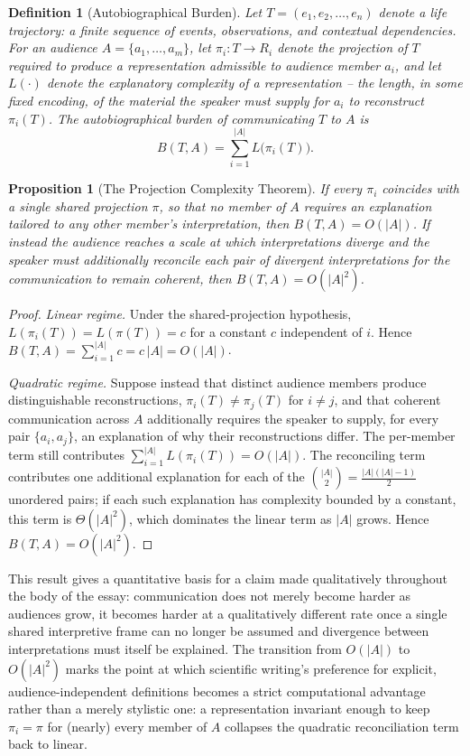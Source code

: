 \documentclass[11pt]{article}
\theoremstyle{plain}
\newtheorem{definition}{Definition}[section]
\newtheorem{proposition}{Proposition}[section]
\begin{document}
\begin{definition}[Autobiographical Burden]
Let $T = (e_1, e_2, \ldots, e_n)$ denote a life trajectory: a finite sequence of events, observations, and contextual dependencies. For an audience $A = \{a_1,\ldots,a_m\}$, let $\pi_i : T \to R_i$ denote the projection of $T$ required to produce a representation admissible to audience member $a_i$, and let $L(\cdot)$ denote the explanatory complexity of a representation -- the length, in some fixed encoding, of the material the speaker must supply for $a_i$ to reconstruct $\pi_i(T)$. The autobiographical burden of communicating $T$ to $A$ is
\[
B(T,A) = \sum_{i=1}^{|A|} L\big(\pi_i(T)\big).
\]
\end{definition}

\begin{proposition}[The Projection Complexity Theorem]
If every $\pi_i$ coincides with a single shared projection $\pi$, so that no member of $A$ requires an explanation tailored to any other member's interpretation, then $B(T,A) = O(|A|)$. If instead the audience reaches a scale at which interpretations diverge and the speaker must additionally reconcile each pair of divergent interpretations for the communication to remain coherent, then $B(T,A) = O(|A|^2)$.
\end{proposition}
\begin{proof}
\emph{Linear regime.} Under the shared-projection hypothesis, $L(\pi_i(T)) = L(\pi(T)) = c$ for a constant $c$ independent of $i$. Hence $B(T,A) = \sum_{i=1}^{|A|} c = c\,|A| = O(|A|)$.

\emph{Quadratic regime.} Suppose instead that distinct audience members produce distinguishable reconstructions, $\pi_i(T) \neq \pi_j(T)$ for $i \neq j$, and that coherent communication across $A$ additionally requires the speaker to supply, for every pair $\{a_i,a_j\}$, an explanation of why their reconstructions differ. The per-member term still contributes $\sum_{i=1}^{|A|} L(\pi_i(T)) = O(|A|)$. The reconciling term contributes one additional explanation for each of the $\binom{|A|}{2} = \tfrac{|A|(|A|-1)}{2}$ unordered pairs; if each such explanation has complexity bounded by a constant, this term is $\Theta(|A|^2)$, which dominates the linear term as $|A|$ grows. Hence $B(T,A) = O(|A|^2)$.
\end{proof}

This result gives a quantitative basis for a claim made qualitatively throughout the body of the essay: communication does not merely become harder as audiences grow, it becomes harder at a qualitatively different rate once a single shared interpretive frame can no longer be assumed and divergence between interpretations must itself be explained. The transition from $O(|A|)$ to $O(|A|^2)$ marks the point at which scientific writing's preference for explicit, audience-independent definitions becomes a strict computational advantage rather than a merely stylistic one: a representation invariant enough to keep $\pi_i = \pi$ for (nearly) every member of $A$ collapses the quadratic reconciliation term back to linear.
\end{document}
